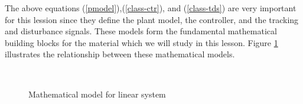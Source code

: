 \documentclass[a4paper]{article}
\theoremstyle{plain} %
{\theorembodyfont{\normalfont}
\newtheorem{Exa}{Example}}
\begin{document}
The above equations (\ref{pmodel}),(\ref{class-ctr}), and
(\ref{class-tds}) are very important for this lession since they
define the plant model, the controller, and the tracking and
disturbance signals. These models form the fundamental
mathematical building blocks for the material which we will study
in this lesson. Figure \ref{model-ls} illustrates the
relationship between these mathematical models.\\

\begin{figure}[h]
~\centering %
\caption{Mathematical model for linear system} %
\label{model-ls}
\end{figure}
\end{document}
